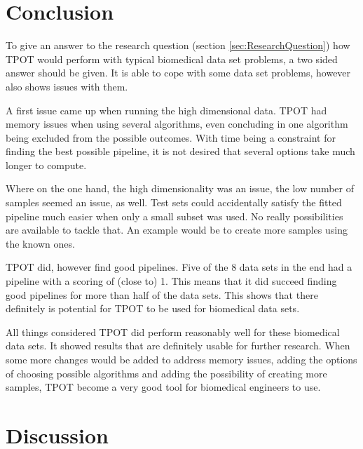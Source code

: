 \documentclass[10pt,a4paper]{article}
\begin{document}
	\section{Conclusion}
	\label{sec:Conclusion}
	
	To give an answer to the research question (section \ref{sec:ResearchQuestion}) how TPOT would perform with typical biomedical data set problems, a two sided answer should be given. It is able to cope with some data set problems, however also shows issues with them.
	
	A first issue came up when running the high dimensional data. TPOT had memory issues when using several algorithms, even concluding in one algorithm being excluded from the possible outcomes. With time being a constraint for finding the best possible pipeline, it is not desired that several options take much longer to compute. 
	
	
	Where on the one hand, the high dimensionality was an issue, the low number of samples seemed an issue, as well. Test sets could accidentally satisfy the fitted pipeline much easier when only a small subset was used. No really possibilities are available to tackle that. An example would be to create more samples using the known ones.
	
	
	TPOT did, however find good pipelines. Five of the 8 data sets in the end had a pipeline with a scoring of (close to) 1. This means that it did succeed finding good pipelines for more than half of the data sets. This shows that there definitely is potential for TPOT to be used for biomedical data sets.
	
	All things considered TPOT did perform reasonably well for these biomedical data sets. It showed results that are definitely usable for further research. When some more changes would be added to address memory issues, adding the options of choosing possible algorithms and adding the possibility of creating more samples, TPOT become a very good tool for biomedical engineers to use.
	
	\section{Discussion}
	\label{sec:Discussion}
	
\end{document}
